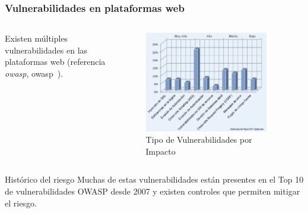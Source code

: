 \begin{frame}[shrink=20]
  \frametitle{Vulnerabilidades en plataformas web}
	\begin{columns}
	\begin{column}{0.5\textwidth}
		Existen múltiples vulnerabilidades en las plataformas web (referencia {\em \acrlong{owasp}}, \acrshort{owasp}~\cite{owasptop10}).
	\end{column}
	\begin{column}{0.5\textwidth}  %
		\begin{figure}
			\includegraphics[width=0.9\textwidth]{fig/Vulnerabilidades_OWASP}
      \caption{\small{Tipo de Vulnerabilidades por Impacto~\cite{vulnimpact}}}
		\end{figure}
	\end{column}
	\end{columns}
  \begin{block}{Histórico del riesgo}
    Muchas de estas vulnerabilidades están presentes en el Top 10 de vulnerabilidades OWASP desde 2007 y existen controles que permiten mitigar el riesgo.
  \end{block}
\end{frame}

